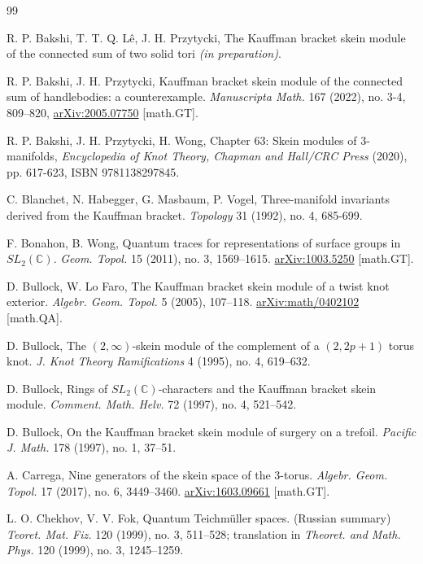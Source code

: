 \documentclass[12pt]{amsproc}
\begin{document}
    
    \begin{thebibliography}{99}
    

R. P. Bakshi, T. T. Q. Lê, J. H. Przytycki, The Kauffman bracket skein module of the connected sum of two solid tori {\it (in preparation)}.

R. P. Bakshi, J. H. Przytycki, Kauffman bracket skein module of the connected sum of handlebodies: a counterexample. {\it Manuscripta Math.} 167 (2022), no. 3-4, 809–820, \href{https://arxiv.org/abs/2005.07750}{arXiv:2005.07750} [math.GT].

R. P. Bakshi, J. H. Przytycki, H. Wong, Chapter 63: Skein modules of $3$-manifolds, {\it Encyclopedia of Knot Theory, Chapman and Hall/CRC Press} (2020), pp. 617-623, ISBN 9781138297845.

C. Blanchet, N. Habegger, G. Masbaum, P. Vogel, Three-manifold invariants derived from the Kauffman bracket. {\it Topology} 31 (1992), no. 4, 685-699.

F. Bonahon, B. Wong, 
Quantum traces for representations of surface groups in $SL_2(\mathbb{C})$.
{\it Geom. Topol.} 15 (2011), no. 3, 1569–1615. \href{https://arxiv.org/abs/1003.5250}{arXiv:1003.5250} [math.GT].
    
D. Bullock, W. Lo Faro,
The Kauffman bracket skein module of a twist knot exterior. 
{\it Algebr. Geom. Topol.} 5 (2005), 107–118. \href{https://arxiv.org/abs/math/0402102}{arXiv:math/0402102} [math.QA].
    
D. Bullock, The $(2,\infty)$-skein module of the complement of a $(2,2p+1)$ torus knot.
{\it J. Knot Theory Ramifications} 4 (1995), no. 4, 619–632.

D. Bullock,
Rings of $SL_2(\mathbb{C})$-characters and the Kauffman bracket skein module. {\it Comment. Math. Helv.} 72 (1997), no. 4, 521–542. 

D. Bullock,
On the Kauffman bracket skein module of surgery on a trefoil. 
{\it Pacific J. Math.} 178 (1997), no. 1, 37–51.
    
A. Carrega,
Nine generators of the skein space of the $3$-torus.  
{\it Algebr. Geom. Topol.} 17 (2017), no. 6, 3449–3460. \href{https://arxiv.org/abs/1603.09661}{arXiv:1603.09661} [math.GT].

L. O. Chekhov, V. V. Fok, 
Quantum Teichmüller spaces. (Russian summary) 
{\it Teoret. Mat. Fiz.} 120 (1999), no. 3, 511–528; translation in 
{\it Theoret. and Math. Phys.} 120 (1999), no. 3, 1245–1259. 


\end{thebibliography}
\end{document}
